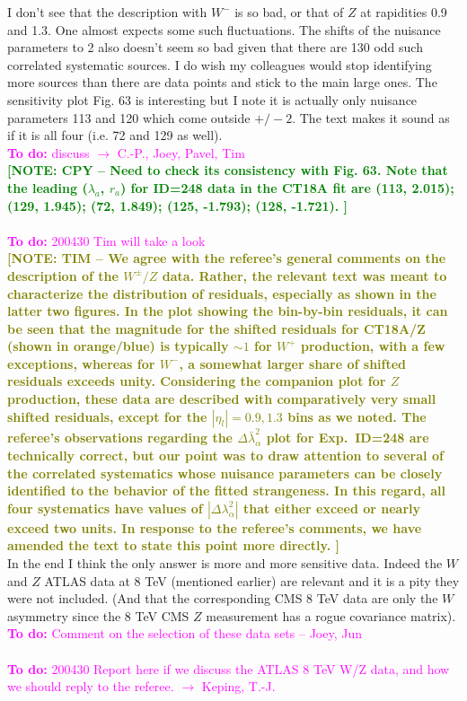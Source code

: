 \documentclass[aps,prd,amsmath,nofootinbib,floatfix,fleqn]{revtex4}
\newcommand{\TODO}[1]{\textcolor{magenta}{
\quad\vspace{3pt} \\ {\bf To do:} #1 \\
}}
\newcommand{\NOTECPY}[1]{\textcolor{green}{ \bf[NOTE: CPY -- #1 ]}}
\newcommand{\NOTETIM}[1]{\textcolor{olive}{ \bf[NOTE: TIM -- #1 ]}}
\begin{document}
\noindent 
I don’t see that the description with $W^-$ is so bad, or that of $Z$ at rapidities 0.9 and 1.3. One almost expects some such fluctuations. The shifts of the nuisance parameters to 2 also doesn’t seem so bad given that there are 130 odd such correlated systematic sources. I do wish my colleagues would stop identifying more sources than there are data points and stick to the main large ones. The sensitivity plot Fig. 63 is interesting but I note it is actually only nuisance parameters 113 and 120 which come outside $+/-2$. The text makes it sound as if it is all four (i.e. 72 and 129 as well).  
\TODO{discuss $\to$ C.-P., Joey, Pavel, Tim}
\NOTECPY{Need to check its consistency with Fig. 63.
Note that the leading ($\lambda_a$, $r_a$) for ID=248 data in the CT18A fit are 
(113, 2.015); 
(129, 1.945); 
(72, 1.849);
(125, -1.793);
(128, -1.721).
}\\
\TODO{200430 Tim will take a look}
%
\NOTETIM{We agree with the referee's general comments on the description of the $W^\pm/Z$
data.  Rather, the relevant text was meant to characterize the distribution of residuals,
especially as shown in the latter two figures.  In the plot showing the bin-by-bin
residuals, it can be seen that the magnitude for the shifted residuals for CT18A/Z (shown
in orange/blue) is typically $\sim\!1$ for $W^+$ production, with a few exceptions, whereas for $W^-$, a somewhat larger share of shifted residuals exceeds unity.  Considering the companion
plot for $Z$ production, these data are described with comparatively very small shifted
residuals, except for the $|\eta_l| = 0.9, 1.3$ bins as we noted.
The referee's observations regarding the $\Delta \bar{\lambda}^2_\alpha$ plot for
Exp.~ID=248 are technically correct, but our point was to draw attention to several of the
correlated systematics whose nuisance parameters can be closely identified to the behavior
of the fitted strangeness. In this regard, all four systematics have values of
$|\Delta \lambda^2_\alpha|$ that either exceed or nearly exceed two units.  In response
to the referee's comments, we have amended the text to state this point more directly.}\\


\noindent 
In the end I think the only answer is more and more sensitive data. Indeed the $W$ and $Z$ ATLAS data at 8 TeV (mentioned earlier) are relevant and it is a pity they were not included. (And that the corresponding CMS 8 TeV data are only the $W$ asymmetry since the 8 TeV CMS $Z$ measurement has a rogue covariance matrix).  
\TODO{Comment on the selection of these data sets -- Joey, Jun}
\TODO{200430 Report here if we discuss the ATLAS 8 TeV W/Z data, and how we should reply to the referee.  $\to$ Keping, T.-J.}
\end{document}
